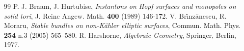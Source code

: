 \documentclass[10pt,a4paper]{amsart}
\theoremstyle{plain}
\theoremstyle{definition}
\theoremstyle{remark}
\begin{document}
\begin{thebibliography}{99}
 P. J. Braam, J. Hurtubise, {\it Instantons on Hopf surfaces and monopoles on solid tori}, J. Reine Angew. Math. {\bf 400} (1989) 146-172.
 V. Br\^{\i}nz\u{a}nescu, R. Moraru, {\it Stable bundles on non-K\"ahler elliptic surfaces}, Commun. Math. Phys. {\bf 254}  n.3   (2005) 565--580.
 R. Harshorne, {\it Algebraic Geometry}, Springer, Berlin, 1977.
\end{thebibliography}
\end{document}
